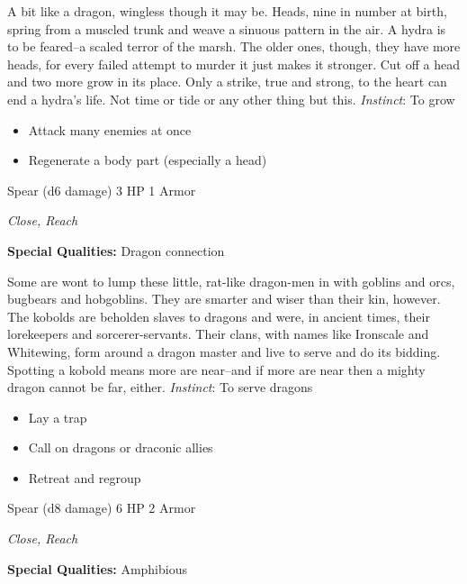 \HRule
A bit like a dragon, wingless though it may be. Heads, nine in number at birth, spring from a muscled trunk and weave a sinuous pattern in the air. A hydra is to be feared--a scaled terror of the marsh. The older ones, though, they have more heads, for every failed attempt to murder it just makes it stronger. Cut off a head and two more grow in its place. Only a strike, true and strong, to the heart can end a hydra's life. Not time or tide or any other thing but this. \emph{Instinct}: To grow
\begin{itemize}
\item Attack many enemies at once
\item Regenerate a body part (especially a head)
\end{itemize}
\newpage
\HRule
{}

Spear (d6 damage)\hspace*{\fill} 3 HP 1 Armor

\emph{Close, Reach}

\textbf{Special Qualities:}
Dragon connection

\HRule
Some are wont to lump these little, rat-like dragon-men in with goblins and orcs, bugbears and hobgoblins. They are smarter and wiser than their kin, however. The kobolds are beholden slaves to dragons and were, in ancient times, their lorekeepers and sorcerer-servants. Their clans, with names like Ironscale and Whitewing, form around a dragon master and live to serve and do its bidding. Spotting a kobold means more are near--and if more are near then a mighty dragon cannot be far, either. \emph{Instinct}: To serve dragons
\begin{itemize}
\item Lay a trap
\item Call on dragons or draconic allies
\item Retreat and regroup
\end{itemize}

\HRule
{}

Spear (d8 damage)\hspace*{\fill} 6 HP 2 Armor

\emph{Close, Reach}

\textbf{Special Qualities:}
Amphibious

